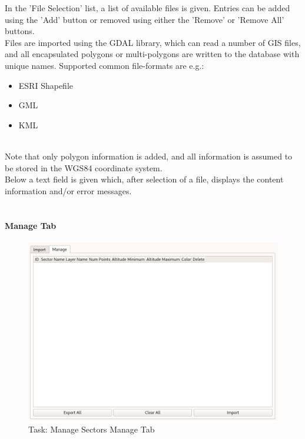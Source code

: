 In the 'File Selection' list, a list of available files is given. Entries can be added using the 'Add' button or removed using either the 'Remove' or 'Remove All' buttons. \\

Files are imported using the GDAL library, which can read a number of GIS files, and all encapsulated polygons or multi-polygons are written to the database with unique names. Supported common file-formats are e.g.:

\begin{itemize}  
\item ESRI Shapefile
\item GML
\item KML
\end{itemize}
\ \\

Note that only polygon information is added, and all information is assumed to be stored in the WGS84 coordinate system. \\

Below a text field is given which, after selection of a file, displays the content information and/or error messages. \\\

\paragraph {Manage Tab}

\begin{figure}[H]
    \includegraphics[width=16cm,frame]{../screenshots/manage_sectors_manage.png}
  \caption{Task: Manage Sectors Manage Tab}
\end{figure}

